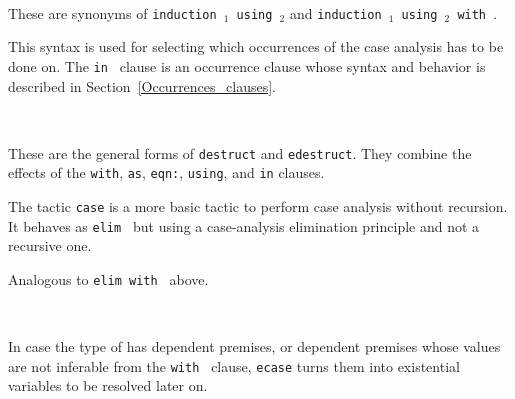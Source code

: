 \begin{Variants}
\item{}\\
     {}

  These are synonyms of {\tt induction {\term$_1$} using {\term$_2$}} and
  {\tt induction {\term$_1$} using {\term$_2$} with {\bindinglist}}.

\item {}

  This syntax is used for selecting which occurrences of {\term} the
  case analysis has to be done on. The {\tt in {\occgoalset}} clause is an
  occurrence clause whose syntax and behavior is described in
  Section~\ref{Occurrences_clauses}.

\item{}\\
     {}

  These are the general forms of {\tt destruct} and {\tt edestruct}.
  They combine the effects of the {\tt with}, {\tt as}, {\tt eqn:}, {\tt using},
  and {\tt in} clauses.

\item{}\label{case}

  The tactic {\tt case} is a more basic tactic to perform case
  analysis without recursion. It behaves as {\tt elim \term} but using
  a case-analysis elimination principle and not a recursive one.

\item {}

  Analogous to {\tt elim {\term} with {\bindinglist}} above.

\item{}\\
  {}

  In case the type of {\term} has dependent premises, or dependent
  premises whose values are not inferable from the {\tt with
  {\bindinglist}} clause, {\tt ecase} turns them into existential
  variables to be resolved later on.


\end{Variants}
